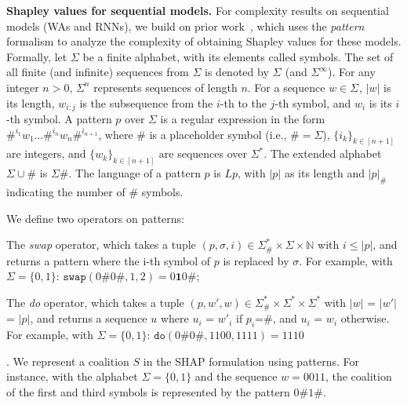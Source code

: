 \textbf{Shapley values for sequential models.} For complexity results on sequential models (WAs and RNNs), we build on prior work~\citep{marzouk24a}, which uses the \emph{pattern} formalism to analyze the complexity of obtaining Shapley values for these models. Formally, let $\Sigma$ be a finite alphabet, with its elements called symbols. The set of all finite (and infinite) sequences from $\Sigma$ is denoted by $\Sigma^{}$ (and $\Sigma^{\infty}$). For any integer $n > 0$, $\Sigma^{n}$ represents sequences of length $n$. For a sequence $w \in \Sigma^{}$, $|w|$ is its length, $w_{i:j}$ is the subsequence from the $i$-th to the $j$-th symbol, and $w_{i}$ is its $i$-th symbol. A pattern $p$ over $\Sigma$ is a regular expression in the form $\#^{i_{1}}w_{1} \ldots \#^{i_{n}}w_{n}\#^{i_{n+1}}$, where $\#$ is a placeholder symbol (i.e., $\# = \Sigma$), $\{i_{k}\}_{k \in [n+1]}$ are integers, and $\{w_{k}\}_{k \in [n+1]}$ are sequences over $\Sigma^{*}$. The extended alphabet $\Sigma \cup \#$ is $\Sigma{\#}$. The language of a pattern $p$ is $L{p}$, with $|p|$ as its length and $|p|_{\#}$ indicating the number of $\#$ symbols. 

We define two operators on patterns: \begin{inparaenum}[(i)] \item The \emph{swap} operator, which takes a tuple $(p,\sigma,i) \in \Sigma_{\#}^{*} \times \Sigma \times \mathbb{N}$ with $i \leq |p|$, and returns a pattern where the i-th symbol of $p$ is replaced by $\sigma$. For example, with $\Sigma = \{0,1\}$: $\texttt{swap}(0\#0\#, 1,2) = 0\mathbf{1}0\#$; \item The \emph{do} operator, which takes a tuple $(p,w',w) \in \Sigma_{\#}^{*} \times \Sigma^{*} \times \Sigma^{*}$ with $|w|$ = $|w'|$ = $|p|$, and returns a sequence $u$ where $u_{i}$ = $w'_{i}$ if $p_{i}$=$\#$, and $u_{i}$ = $w_{i}$ otherwise. For example, with $\Sigma = \{0,1\}$: $\texttt{do}(0\#0\#,1100,1111) = 1110$ \end{inparaenum}. We represent a coalition $S$ in the SHAP formulation using patterns. For instance, with the alphabet $\Sigma = \{0,1\}$ and the sequence $w = 0011$, the coalition of the first and third symbols is represented by the pattern $0\#1\#$.



